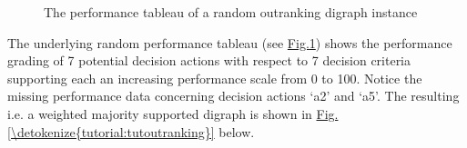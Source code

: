 \documentclass[a4paper,12pt,english]{sphinxhowto}
\let\sphinxpxdimen\pdfpxdimen\else\newdimen\sphinxpxdimen
\begin{document}
\begin{sphinxVerbatim}[commandchars=\\\{\},numbers=left,firstnumber=1,stepnumber=1]
   
  
\end{sphinxVerbatim}

\begin{figure}[H]
\centering
\capstart

\noindent\sphinxincludegraphics[width=550\sphinxpxdimen]{{randomOutranking}.png}
\caption{The performance tableau of a random outranking digraph instance}\label{\detokenize{tutorial:randomoutranking}}\end{figure}

The underlying random performance tableau (see \hyperref[\detokenize{tutorial:randomoutranking}]{Fig.\@ \ref{\detokenize{tutorial:randomoutranking}}}) shows the performance grading of 7 potential decision actions with respect to 7 decision criteria supporting each an increasing performance scale from 0 to 100. Notice the missing performance data concerning decision actions ‘a2’ and ‘a5’. The resulting  \sphinxhyphen{} i.e. a weighted majority supported \sphinxhyphen{}  \sphinxhyphen{} digraph is shown in \hyperref[\detokenize{tutorial:tutoutranking}]{Fig.\@ \ref{\detokenize{tutorial:tutoutranking}}} below.
\end{document}
